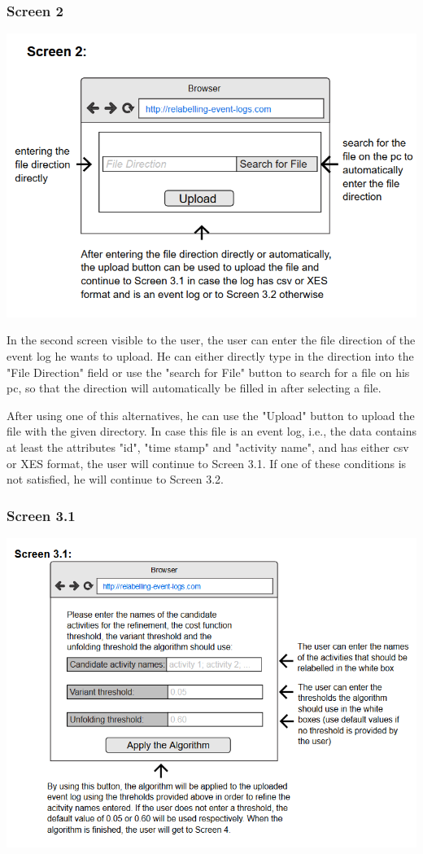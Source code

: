 \documentclass[notitlepage]{article}
\begin{document}
\begin{flushleft}
\subsubsection{Screen 2}

\includegraphics[scale=0.9]{InterfaceMockup2.png}

In the second screen visible to the user, the user can enter the file direction of the event log he wants to upload. He can either directly type in the direction into the "File Direction" field or use the "search for File" button to search for a file on his pc, so that the direction will automatically be filled in after selecting a file.

After using one of this alternatives, he can use the "Upload" button to upload the file with the given directory. In case this file is an event log, i.e., the data contains at least the attributes "id", "time stamp" and "activity name", and has either csv or XES format, the user will continue to Screen 3.1. If one of these conditions is not satisfied, he will continue to Screen 3.2. 


\subsubsection{Screen 3.1}
\includegraphics[scale=0.9]{InterfaceMockup3-1.png}


\end{flushleft}
\end{document}
